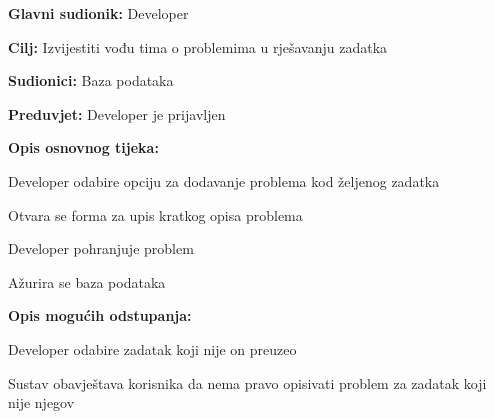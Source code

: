                         	\noindent {}
                        	\begin{packed_item}
                        		
                        		\item \textbf{Glavni sudionik: }Developer
                        		\item  \textbf{Cilj:} Izvijestiti vođu tima o problemima u rješavanju zadatka
                        		\item  \textbf{Sudionici:} Baza podataka
                        		\item  \textbf{Preduvjet:} Developer je prijavljen
                        		\item  \textbf{Opis osnovnog tijeka:}
                        		
                        		\item[] \begin{packed_enum}
                        			
                        			\item Developer odabire opciju za dodavanje problema kod željenog zadatka
                        			\item Otvara se forma za upis kratkog opisa problema
                        			\item Developer pohranjuje problem
                        			\item Ažurira se baza podataka
                        			
                        		\end{packed_enum}
                        		\item  \textbf{Opis mogućih odstupanja:}
                        	
                        	\item[] \begin{packed_item}
                        		
                        		\item[1.a] Developer odabire zadatak koji nije on preuzeo
                        		\item[] \begin{packed_enum}
                        			
                        			\item Sustav obavještava korisnika da nema pravo opisivati problem za zadatak koji nije njegov
                        			
                        		\end{packed_enum}
                        		
                        		
                        	\end{packed_item}
                        		
                        		
                        	\end{packed_item}
